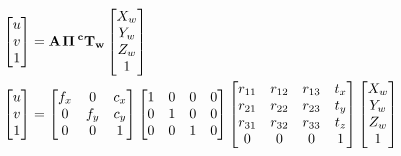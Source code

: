 \documentclass[a4paper,twoside,openright,12pt,slovene]{book}
\begin{document}
\begin{align} \begin{bmatrix} u \\ v \\ 1 \end{bmatrix} &= \bf{A} \hspace{0.1em} \Pi \hspace{0.2em} ^{c}\bf{T}_w \begin{bmatrix} X_{w} \\ Y_{w} \\ Z_{w} \\ 1 \end{bmatrix} \\ \begin{bmatrix} u \\ v \\ 1 \end{bmatrix} &= \begin{bmatrix} f_x & 0 & c_x \\ 0 & f_y & c_y \\ 0 & 0 & 1 \end{bmatrix} \begin{bmatrix} 1 & 0 & 0 & 0 \\ 0 & 1 & 0 & 0 \\ 0 & 0 & 1 & 0 \end{bmatrix} \begin{bmatrix} r_{11} & r_{12} & r_{13} & t_x \\ r_{21} & r_{22} & r_{23} & t_y \\ r_{31} & r_{32} & r_{33} & t_z \\ 0 & 0 & 0 & 1 \end{bmatrix} \begin{bmatrix}\label{PNP} X_{w} \\ Y_{w} \\ Z_{w} \\ 1 \end{bmatrix} \end{align}
\end{document}
